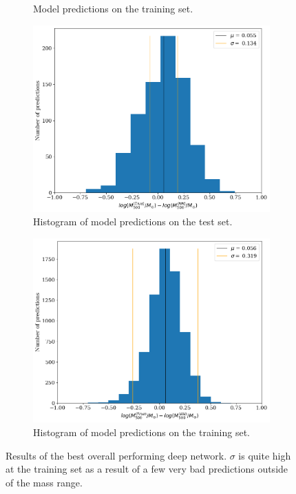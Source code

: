 \begin{figure}[H]
\begin{subfigure}{.46\textwidth}
  \caption{Model predictions on the training set.}
  \label{fig:best_perf_resnet152v2_b}
\end{subfigure}
\begin{subfigure}{.46\textwidth}
  \centering
  \includegraphics[width=\linewidth]{images/Chapter4/Res152V2/res152v2_test_hist.png}
  \caption{Histogram of model predictions on the test set.}
  \label{fig:best_perf_resnet152v2_c}
\end{subfigure}%
\hspace{.6em}
\begin{subfigure}{.46\textwidth}
  \centering
  \includegraphics[width=\linewidth]{images/Chapter4/Res152V2/res152v2_train_hist.png}
  \caption{Histogram of model predictions on the training set.}
  \label{fig:best_perf_resnet152v2_d}
\end{subfigure}
\caption{Results of the best overall performing deep network. $\sigma$ is quite high at the training set as a result of a few very bad predictions outside of the mass range. } 
\label{fig:best_perf_resnet152v2}
\end{figure}

